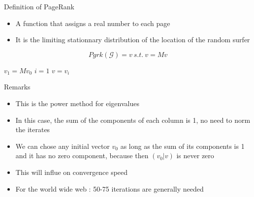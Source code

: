 \documentclass[10pt]{beamer}
\begin{document}
\begin{frame}[allowframebreaks]{Definition of PageRank}
  \begin{definition}
    \begin{itemize}
      \item A function that assigns a real number to each page
	\item It is the limiting stationnary distribution of the location of the random surfer
    \end{itemize}
    $$Pgrk(\mathcal{G}) = v \:s.t.\: v=Mv $$
  \end{definition}
  \framebreak
  \begin{algorithm}[H]
    $v_1 = Mv_0$\;
    $i=1$\;
    $v = v_{i}$\;
    \caption{PageRank}
  \end{algorithm}
\end{frame}

\begin{frame}{Remarks}
\begin{itemize}
\item This is the power method for eigenvalues
\item In this case, the sum of the components of each column is 1, no need to norm the iterates
\item We can chose any initial vector $v_0$ as long as the sum of its components is 1 and it has no zero component, because then $(v_0|v)$ is never zero
\item This will influe on convergence speed
\item For the world wide web : 50-75 iterations are generally needed
\end{itemize}
\end{frame}

\end{document}
